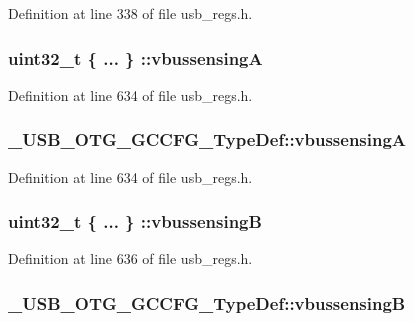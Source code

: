 Definition at line 338 of file usb\-\_\-regs.\-h.

\hypertarget{group___u_s_b___o_t_g___d_r_i_v_e_r_ga211489f1d9ffe6ad6a0abb8f02a1a2f8}{
\subsubsection[{vbussensing\-A}]{\setlength{\rightskip}{0pt plus 5cm}uint32\-\_\-t \{ ... \} \-::vbussensing\-A}}\label{group___u_s_b___o_t_g___d_r_i_v_e_r_ga211489f1d9ffe6ad6a0abb8f02a1a2f8}


Definition at line 634 of file usb\-\_\-regs.\-h.

\hypertarget{group___u_s_b___o_t_g___d_r_i_v_e_r_gac18d70824581f11bbd03f2ef67b29b8d}{
\subsubsection[{vbussensing\-A}]{ \-\_\-\-U\-S\-B\-\_\-\-O\-T\-G\-\_\-\-G\-C\-C\-F\-G\-\_\-\-Type\-Def\-::vbussensing\-A}}\label{group___u_s_b___o_t_g___d_r_i_v_e_r_gac18d70824581f11bbd03f2ef67b29b8d}


Definition at line 634 of file usb\-\_\-regs.\-h.

\hypertarget{group___u_s_b___o_t_g___d_r_i_v_e_r_ga64a275b21432bb4db0e168bae13398db}{
\subsubsection[{vbussensing\-B}]{\setlength{\rightskip}{0pt plus 5cm}uint32\-\_\-t \{ ... \} \-::vbussensing\-B}}\label{group___u_s_b___o_t_g___d_r_i_v_e_r_ga64a275b21432bb4db0e168bae13398db}


Definition at line 636 of file usb\-\_\-regs.\-h.

\hypertarget{group___u_s_b___o_t_g___d_r_i_v_e_r_ga2be201bafae01439bca7d3c5c503e702}{
\subsubsection[{vbussensing\-B}]{ \-\_\-\-U\-S\-B\-\_\-\-O\-T\-G\-\_\-\-G\-C\-C\-F\-G\-\_\-\-Type\-Def\-::vbussensing\-B}}\label{group___u_s_b___o_t_g___d_r_i_v_e_r_ga2be201bafae01439bca7d3c5c503e702}


